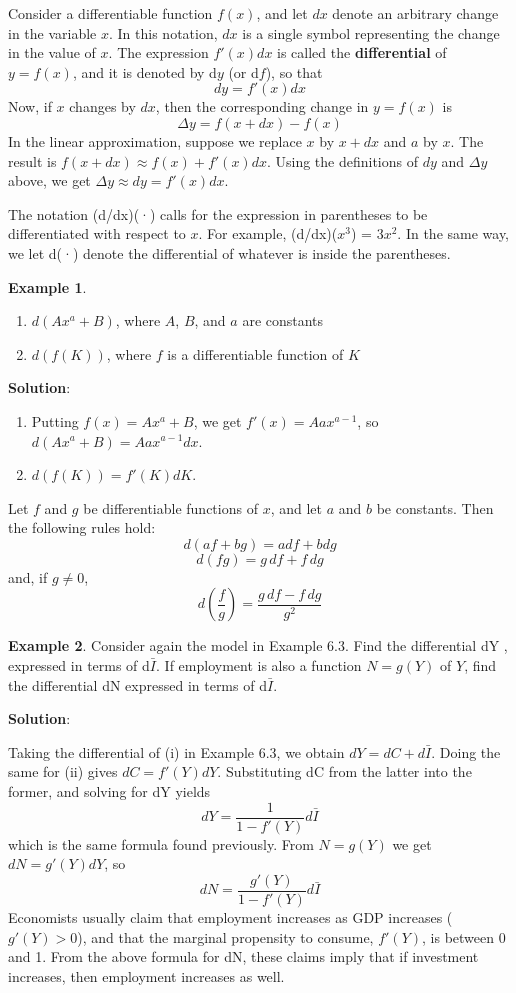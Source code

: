 \documentclass[10pt,a4paper]{book}
\theoremstyle{definition}\newtheorem{definition}{Definition}
\theoremstyle{definition}\newtheorem{fact}{Fact}
\theoremstyle{definition}\newtheorem{ex}{Ex.}
\theoremstyle{definition}\newtheorem{project}{Project}
\theoremstyle{definition}\newtheorem{problem}{Problem}
\theoremstyle{definition}\newtheorem{example}{Example}
\numberwithin{theorem}{chapter}
\numberwithin{corollary}{chapter}
\numberwithin{assumption}{chapter}
\numberwithin{definition}{chapter}
\numberwithin{prop}{chapter}
\numberwithin{notation}{chapter}
\numberwithin{problem}{chapter}
\numberwithin{example}{chapter}
\numberwithin{fact}{chapter}
\numberwithin{ex}{chapter}
\begin{document}
	Consider a differentiable function $f(x)$, and let $dx$ denote an arbitrary change in the variable $x$. In this notation, $dx$ is a single symbol representing the change in the value of $x$. The expression $f'(x)dx$ is called the \textbf{differential} of $y = f(x)$, and it is denoted by d$y$ (or d$f$), so that
	$$dy = f'(x) dx$$
	Now, if $x$ changes by $dx$, then the corresponding change in $y = f(x)$ is
	$$\Delta y = f(x+dx)-f(x)$$
	In the linear approximation, suppose we replace $x$ by $x + dx$ and $a$ by $x$. The result is $f(x+dx)\approx f(x)+f'(x)dx$. Using the definitions of $dy$ and $\Delta y$ above, we get $\Delta y \approx dy = f'(x)dx$.
	
	The notation (d/dx)(·) calls for the expression in parentheses to be differentiated with respect to $x$. For example, (d/dx)($x^3$) = $3x^2$. In the same way, we let d(·) denote the differential of whatever is inside the parentheses.
	
	\begin{example}
		\begin{enumerate}[label=(\alph*)]
			\item $d(Ax^a + B)$, where $A$, $B$, and $a$ are constants
			\item $d(f(K))$, where $f$ is a differentiable function of $K$
		\end{enumerate}
		\textbf{Solution}:
		\begin{enumerate}[label=(\alph*)]
			\item Putting $f(x) = Ax^a + B$, we get $f'(x) = Aax^{a-1}$, so $d(Ax^a + B) = Aax^{a-1}dx$.
			\item $d(f(K)) = f'(K)dK$.
		\end{enumerate}
	\end{example}
	
	Let $f$ and $g$ be differentiable functions of $x$, and let $a$ and $b$ be constants. Then the following rules hold:
	$$d(af + bg) = a df + b dg$$
	$$d( fg) = g\,df + f\,dg$$
	and, if $g \neq 0$,
	$$d \left(\frac{f}{g}\right) = \frac{g\,df-f \, dg }{g^2}$$
	
	\begin{example}
		Consider again the model in Example 6.3. Find the differential dY , expressed in terms of d$\bar{I}$. If employment is also a function $N = g(Y)$ of $Y$, find the differential dN expressed in terms of d$\bar{I}$.
		
		\textbf{Solution}:
		
		Taking the differential of (i) in Example 6.3, we obtain $dY = dC + d\bar{I}$. Doing the same for (ii) gives $dC = f'(Y)dY$. Substituting dC from the latter into the former, and solving for dY yields
		$$dY = \frac{1}{1-f'(Y)}d\bar{I}$$
		which is the same formula found previously. From $N = g(Y)$ we get $dN = g'(Y)dY$, so
		$$dN = \frac{g'(Y)}{1-f'(Y)}d\bar{I}$$
		Economists usually claim that employment increases as GDP increases ($g'(Y) > 0$), and that the marginal propensity to consume, $f'(Y)$, is between 0 and 1. From the above formula for dN, these claims imply that if investment increases, then employment increases as well.
	\end{example}
	
\end{document}
